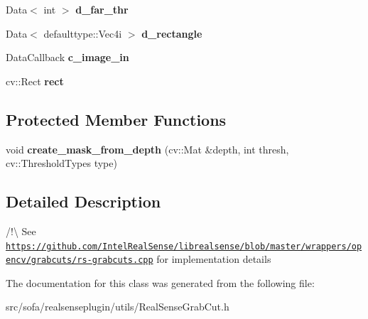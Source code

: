 \begin{DoxyCompactItemize}
Data$<$ int $>$ {\bfseries d\+\_\+far\+\_\+thr}
\item 
\mbox{\label{classsofa_1_1rgbdtracking_1_1_real_sense_grab_cut_a1de3d863a69e379fbfe79756db8ad67c}} 
Data$<$ defaulttype\+::\+Vec4i $>$ {\bfseries d\+\_\+rectangle}
\item 
\mbox{\label{classsofa_1_1rgbdtracking_1_1_real_sense_grab_cut_a5c45fc7332469e7272a01924f8db53cf}} 
Data\+Callback {\bfseries c\+\_\+image\+\_\+in}
\item 
\mbox{\label{classsofa_1_1rgbdtracking_1_1_real_sense_grab_cut_adc07cdbc1f27d1e1d1f189a722b6c99d}} 
cv\+::\+Rect {\bfseries rect}
\end{DoxyCompactItemize}
\subsection*{Protected Member Functions}
\begin{DoxyCompactItemize}
\item 
\mbox{\label{classsofa_1_1rgbdtracking_1_1_real_sense_grab_cut_abfa9d9858f8cf1ab78e9e908709383ec}} 
void {\bfseries create\+\_\+mask\+\_\+from\+\_\+depth} (cv\+::\+Mat \&depth, int thresh, cv\+::\+Threshold\+Types type)
\end{DoxyCompactItemize}


\subsection{Detailed Description}
/!\textbackslash{} See \href{https://github.com/IntelRealSense/librealsense/blob/master/wrappers/opencv/grabcuts/rs-grabcuts.cpp}{\tt https\+://github.\+com/\+Intel\+Real\+Sense/librealsense/blob/master/wrappers/opencv/grabcuts/rs-\/grabcuts.\+cpp} for implementation details 

The documentation for this class was generated from the following file\+:\begin{DoxyCompactItemize}
\item 
src/sofa/realsenseplugin/utils/Real\+Sense\+Grab\+Cut.\+h\end{DoxyCompactItemize}
